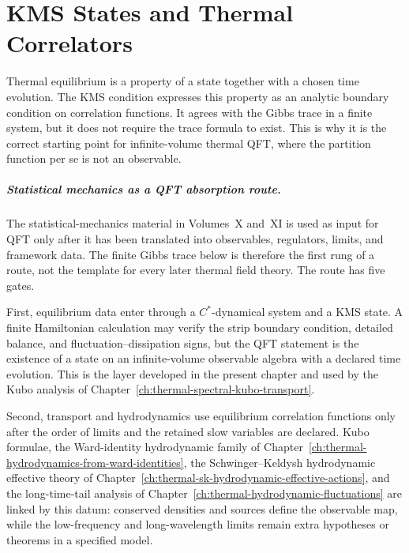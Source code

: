 \chapter{KMS States and Thermal Correlators}
\label{ch:kms-states-thermal-correlators}

\ConventionsRealTime

Thermal equilibrium is a property of a state together with a chosen time
evolution.  The KMS condition expresses this property as an analytic boundary
condition on correlation functions.  It agrees with the Gibbs trace in a
finite system, but it does not require the trace formula to exist.  This is
why it is the correct starting point for infinite-volume thermal QFT, where
the partition function per se is not an observable.

\paragraph{Statistical mechanics as a QFT absorption route.}
The statistical-mechanics material in Volumes~X and~XI is used as input for
QFT only after it has been translated into observables, regulators, limits,
and framework data.  The finite Gibbs trace below is therefore the first
rung of a route, not the template for every later thermal field theory.  The
route has five gates.

First, equilibrium data enter through a \(C^\ast\)-dynamical system and a
KMS state.  A finite Hamiltonian calculation may verify the strip boundary
condition, detailed balance, and fluctuation--dissipation signs, but the
QFT statement is the existence of a state on an infinite-volume observable
algebra with a declared time evolution.  This is the layer developed in the
present chapter and used by the Kubo analysis of
Chapter~\ref{ch:thermal-spectral-kubo-transport}.

Second, transport and hydrodynamics use equilibrium correlation functions
only after the order of limits and the retained slow variables are declared.
Kubo formulae, the Ward-identity hydrodynamic family of
Chapter~\ref{ch:thermal-hydrodynamics-from-ward-identities}, the
Schwinger--Keldysh hydrodynamic effective theory of
Chapter~\ref{ch:thermal-sk-hydrodynamic-effective-actions}, and the
long-time-tail analysis of Chapter~\ref{ch:thermal-hydrodynamic-fluctuations}
are linked by this datum: conserved densities and sources define the
observable map, while the low-frequency and long-wavelength limits remain
extra hypotheses or theorems in a specified model.

